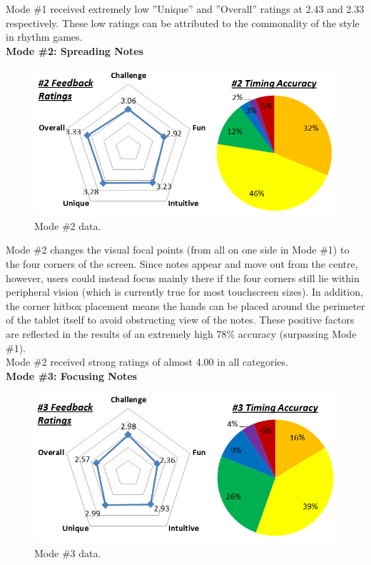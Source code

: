 \documentclass{sig-alternate}
\begin{document}
Mode \#1 received extremely low ''Unique'' and ''Overall'' ratings at 2.43 and 2.33 respectively. These low ratings can be attributed to the commonality of the style in rhythm games. \\

\noindent \textbf{Mode \#2: Spreading Notes}

\begin{figure}[htb!]
	\begin{center}
		\includegraphics[width=1\linewidth]{figure_chart_2}
	\end{center}
	\vspace{-12pt}
	\caption{Mode \#2 data.}
	\label{fig:chart_2}
\end{figure}

Mode \#2 changes the visual focal points (from all on one side in Mode \#1) to the four corners of the screen. Since notes appear and move out from the centre, however, users could instead focus mainly there if the four corners still lie within peripheral vision (which is currently true for most touchscreen sizes). In addition, the corner hitbox placement means the hands can be placed around the perimeter of the tablet itself to avoid obstructing view of the notes. These positive factors are reflected in the results of an extremely high 78\% accuracy (surpassing Mode \#1).\\

Mode \#2 received strong ratings of almost 4.00 in all categories. \\

\newpage
\noindent \textbf{Mode \#3: Focusing Notes}

\begin{figure}[htb!]
	\begin{center}
		\includegraphics[width=1\linewidth]{figure_chart_3}
	\end{center}
	\vspace{-12pt}
	\caption{Mode \#3 data.}
	\label{fig:chart_3}
\end{figure}
\end{document}
